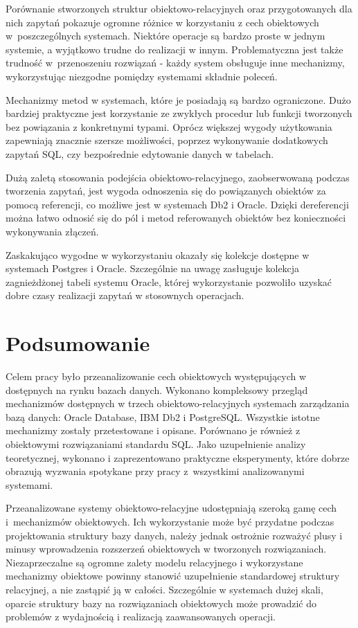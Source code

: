\documentclass[a4paper,twoside,12pt]{book}
\begin{document}
Porównanie stworzonych struktur obiektowo-relacyjnych oraz przygotowanych dla nich zapytań pokazuje ogromne różnice w korzystaniu z cech obiektowych w~poszczególnych systemach. Niektóre operacje są bardzo proste w jednym systemie, a wyjątkowo trudne do realizacji w innym. Problematyczna jest także trudność w~przenoszeniu rozwiązań - każdy system obsługuje inne mechanizmy, wykorzystując niezgodne pomiędzy systemami składnie poleceń.

Mechanizmy metod w systemach, które je posiadają są bardzo ograniczone. Dużo bardziej praktyczne jest korzystanie ze zwykłych procedur lub funkcji tworzonych bez powiązania z konkretnymi typami. Oprócz większej wygody użytkowania zapewniają znacznie szersze możliwości, poprzez wykonywanie dodatkowych zapytań SQL, czy bezpośrednie edytowanie danych w tabelach.

Dużą zaletą stosowania podejścia obiektowo-relacyjnego, zaobserwowaną podczas tworzenia zapytań, jest wygoda odnoszenia się do powiązanych obiektów za pomocą referencji, co możliwe jest w systemach Db2 i Oracle. Dzięki dereferencji można łatwo odnosić się do pól i metod referowanych obiektów bez konieczności wykonywania złączeń.

Zaskakująco wygodne w wykorzystaniu okazały się kolekcje dostępne w systemach Postgres i Oracle. Szczególnie na uwagę zasługuje kolekcja zagnieżdżonej tabeli systemu Oracle, której wykorzystanie pozwoliło uzyskać dobre czasy realizacji zapytań w stosownych operacjach. 

\chapter{Podsumowanie}

Celem pracy było przeanalizowanie cech obiektowych występujących w dostępnych na rynku bazach danych. Wykonano kompleksowy przegląd mechanizmów dostępnych w trzech obiektowo-relacyjnych systemach zarządzania bazą danych: Oracle Database, IBM Db2 i PostgreSQL. Wszystkie istotne mechanizmy zostały przetestowane i opisane. Porównano je również z obiektowymi rozwiązaniami standardu SQL. Jako uzupełnienie analizy teoretycznej, wykonano i zaprezentowano praktyczne eksperymenty, które dobrze obrazują wyzwania spotykane przy pracy z~wszystkimi analizowanymi systemami.

Przeanalizowane systemy obiektowo-relacyjne udostępniają szeroką gamę cech i~mechanizmów obiektowych. Ich wykorzystanie może być przydatne podczas projektowania struktury bazy danych, należy jednak ostrożnie rozważyć plusy i minusy wprowadzenia rozszerzeń obiektowych w tworzonych rozwiązaniach. Niezaprzeczalne są ogromne zalety modelu relacyjnego i wykorzystane mechanizmy obiektowe powinny stanowić uzupełnienie standardowej struktury relacyjnej, a nie zastąpić ją w całości. Szczególnie w systemach dużej skali, oparcie struktury bazy na rozwiązaniach obiektowych może prowadzić do problemów z wydajnością i realizacją zaawansowanych operacji.
\end{document}
